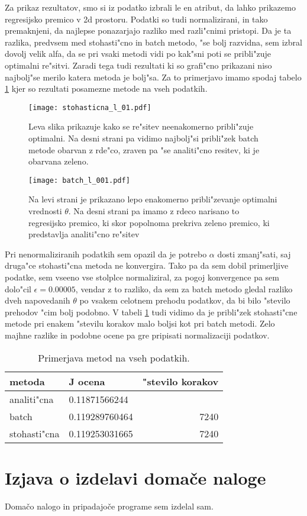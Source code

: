 \documentclass[a4paper,11pt]{article}
\begin{document}
Za prikaz rezultatov, smo si iz podatko izbrali le en atribut, da lahko prikazemo regresijsko premico v 2d prostoru. Podatki so tudi normalizirani, in tako premaknjeni, da najlepse ponazarjajo razliko med razli"cnimi pristopi. Da je ta razlika, predvsem med stohasti"cno in batch metodo, "se bolj razvidna, sem izbral dovolj velik alfa, da se pri vsaki metodi vidi po kak"sni poti se pribli"zuje optimalni re"sitvi. Zaradi tega tudi rezultati ki so grafi"cno prikazani niso najbolj"se merilo katera metoda je bolj"sa. Za to primerjavo imamo spodaj tabelo \ref{tab1} kjer so rezultati posamezne metode na vseh podatkih.

\begin{figure}[htbp]
\begin{center}
\texttt{[image: stohasticna\_l\_01.pdf]}
\caption{Leva slika prikazuje kako se re"sitev neenakomerno pribli"zuje optimalni. Na desni strani pa vidimo najbolj"si pribli"zek batch metode obarvan z rde"co, zraven pa "se analiti"cno resitev, ki je obarvana zeleno. }
\label{stoh}
\end{center}
\end{figure}


\begin{figure}[htbp]
\begin{center}
\texttt{[image: batch\_l\_001.pdf]}
\caption{Na levi strani je prikazano lepo enakomerno pribli"zevanje optimalni vrednosti $\theta$. Na desni strani pa imamo z rdeco narisano to regresijsko premico, ki skor popolnoma prekriva zeleno premico, ki predstavlja analiti"cno re"sitev}
\label{batch}
\end{center}
\end{figure}

Pri nenormaliziranih podatkih sem opazil da je potrebo $\alpha$ dosti zmanj"sati, saj druga"ce stohasti"cna metoda ne konvergira. Tako pa da sem dobil primerljive podatke, sem vseeno vse stolplce normaliziral, za pogoj konvergence pa sem dolo"cil $\epsilon = 0.00005$, vendar z to razliko, da sem za batch metodo gledal razliko dveh napovedanih $\theta$ po vsakem celotnem prehodu podatkov, da bi bilo "stevilo prehodov "cim bolj podobno. V tabeli \ref{tab1} tudi vidimo da je pribli"zek  stohasti"cne metode pri enakem "stevilu korakov malo boljsi kot pri batch metodi. Zelo majhne razlike in podobne ocene pa gre pripisati normalizaciji podatkov.


\begin{table}[htbp]
\begin{center}
\begin{tabular}{|l|l|r|}
\hline
metoda & J ocena & "stevilo korakov \\
\hline
analiti"cna & 0.11871566244 & \\
\hline
batch & 0.119289760464 & 7240\\
\hline
stohasti"cna &0.119253031665 &7240\\
\hline
\end{tabular}
\caption{Primerjava metod na vseh podatkih.}
\label{tab1}
\end{center}
\end{table}



\section{Izjava o izdelavi domače naloge}
Domačo nalogo in pripadajoče programe sem izdelal sam.
\end{document}
